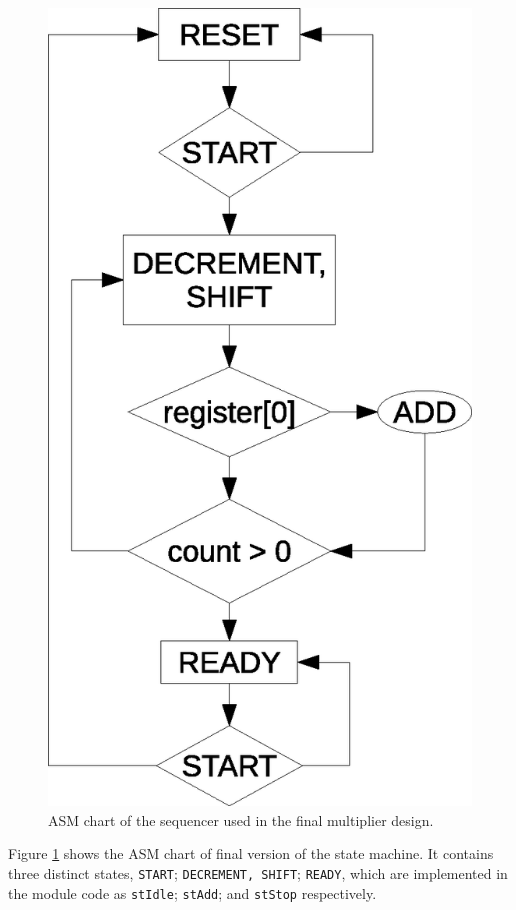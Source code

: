 \documentclass[a4paper,11pt]{article}
\begin{document}
\begin{figure}[H]
    \centering
        \includegraphics[scale=0.65]{finalSequencerASM.eps}
    \caption{ASM chart of the sequencer used in the final multiplier design.}
    \label{fig:fseqASM}
\end{figure}

Figure \ref{fig:fseqASM} shows the ASM chart of final version of the state machine. It contains three distinct states, \lstinline{START}; \lstinline{DECREMENT, SHIFT}; \lstinline{READY}, which are implemented in the module code as \lstinline{stIdle}; \lstinline{stAdd}; and \lstinline{stStop} respectively.
\end{document}

